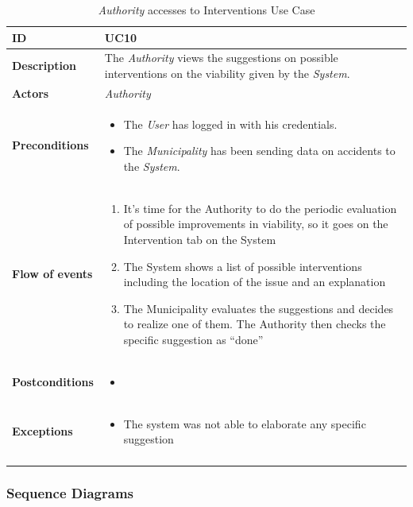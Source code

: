 \documentclass {article}
\begin{document}
	\begin{longtable}{| p{3 cm} | p{10.5cm} |} 
			\hline
			{\bf ID} & UC10 \\
			\hline
			{\bf Description} & The {\it Authority} views the suggestions on possible interventions on the viability given by the {\it System}. \\
			\hline
			{\bf Actors} & {\it Authority}\\
			\hline
			{\bf Preconditions} & \begin{itemize}
								  \item The {\it User} has logged in with his credentials.
								  \item The {\it Municipality} has been sending data on accidents to the {\it System}.
								  \end{itemize}	\\
			\hline
			{\bf Flow of events} &	\begin{enumerate}
								  \item It’s time for the Authority to do the periodic evaluation of possible improvements in viability, so it goes on the Intervention tab on the System
								  \item The System shows a list of possible interventions including the location of the issue and an explanation
								  \item The Municipality evaluates the suggestions and decides to realize one of them. The Authority then checks the specific suggestion as “done”
								  \end{enumerate}	\\
			\hline
			{\bf Postconditions} & \begin{itemize}
								  \item
								  \end{itemize}	 \\
			\hline
			{\bf Exceptions} & 	\begin{itemize}
								  \item The system was not able to elaborate any specific suggestion
								  \end{itemize}	\\
			\hline
			\caption{{\it Authority} accesses to Interventions Use Case}
			\end{longtable}

	\subsubsection{Sequence Diagrams}
\end{document}
